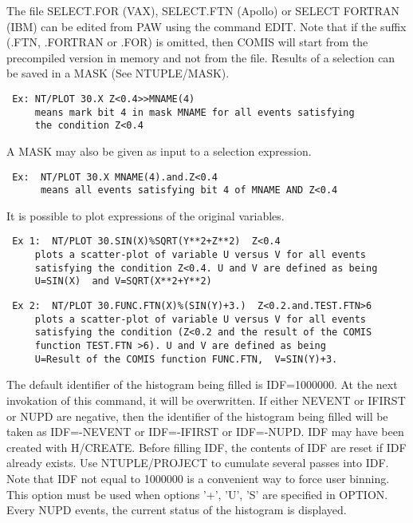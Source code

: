 The file SELECT.FOR (VAX), SELECT.FTN (Apollo) or
SELECT FORTRAN (IBM) can be edited from PAW using the command EDIT.
Note that if the suffix (.FTN, .FORTRAN or .FOR) is omitted, then COMIS
will start from the precompiled version in memory and not from the file.
Results of a selection can be saved in a MASK (See NTUPLE/MASK).
\begin{verbatim}
 Ex: NT/PLOT 30.X Z<0.4>>MNAME(4)
     means mark bit 4 in mask MNAME for all events satisfying
     the condition Z<0.4
\end{verbatim}
A MASK may also be given as input to a selection expression.
\begin{verbatim}
 Ex:  NT/PLOT 30.X MNAME(4).and.Z<0.4
      means all events satisfying bit 4 of MNAME AND Z<0.4
\end{verbatim}
It is possible to plot expressions of the original variables.

\begin{verbatim}
 Ex 1:  NT/PLOT 30.SIN(X)%SQRT(Y**2+Z**2)  Z<0.4
     plots a scatter-plot of variable U versus V for all events
     satisfying the condition Z<0.4. U and V are defined as being
     U=SIN(X)  and V=SQRT(X**2+Y**2)
\end{verbatim}

\begin{verbatim}
 Ex 2:  NT/PLOT 30.FUNC.FTN(X)%(SIN(Y)+3.)  Z<0.2.and.TEST.FTN>6
     plots a scatter-plot of variable U versus V for all events
     satisfying the condition (Z<0.2 and the result of the COMIS
     function TEST.FTN >6). U and V are defined as being
     U=Result of the COMIS function FUNC.FTN,  V=SIN(Y)+3.
\end{verbatim}
The default identifier of the histogram  being filled is IDF=1000000.
At the next invokation of this command, it will be overwritten.
If either NEVENT or IFIRST or NUPD are negative, then the identifier
of the histogram being filled will be taken as IDF=-NEVENT or
IDF=-IFIRST or IDF=-NUPD. IDF may have been created with H/CREATE.
Before filling IDF, the contents of IDF are reset if IDF already
exists. Use NTUPLE/PROJECT to cumulate several passes into IDF.
Note that IDF not equal to 1000000 is a convenient way to force user
binning. This option must be used when options '+', 'U', 'S' are
specified in OPTION.
Every NUPD events, the current status of the  histogram is displayed.
\ENDTEXT

